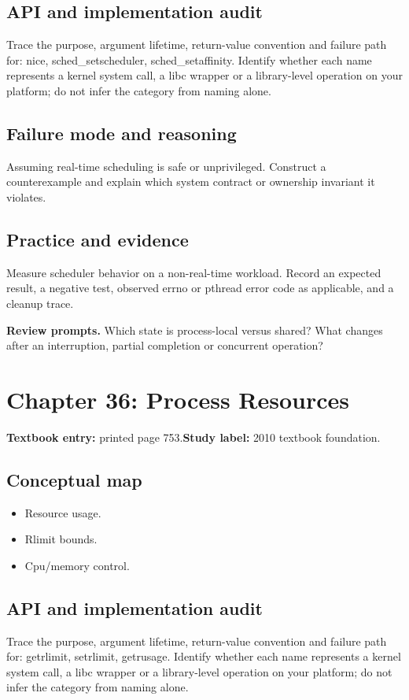 \documentclass[11pt,letterpaper,oneside]{report}
\begin{document}
\subsection{API and implementation audit}
Trace the purpose, argument lifetime, return-value convention and failure path for: nice, sched\_\allowbreak{}setscheduler, sched\_setaffinity. Identify whether each name represents a kernel system call, a libc wrapper or a library-level operation on your platform; do not infer the category from naming alone.

\subsection{Failure mode and reasoning}
Assuming real-time scheduling is safe or unprivileged. Construct a counterexample and explain which system contract or ownership invariant it violates.

\subsection{Practice and evidence}
Measure scheduler behavior on a non-real-time workload. Record an expected result, a negative test, observed errno or pthread error code as applicable, and a cleanup trace.

\textbf{Review prompts.} Which state is process-local versus shared? What changes after an interruption, partial completion or concurrent operation?

\section{Chapter 36: Process Resources}
\textbf{Textbook entry:} printed page 753.\quad \textbf{Study label:} 2010 textbook foundation.

\subsection{Conceptual map}
\begin{itemize}
\item Resource usage.
\item Rlimit bounds.
\item Cpu/memory control.
\end{itemize}
\subsection{API and implementation audit}
Trace the purpose, argument lifetime, return-value convention and failure path for: getrlimit, setrlimit, getrusage. Identify whether each name represents a kernel system call, a libc wrapper or a library-level operation on your platform; do not infer the category from naming alone.
\end{document}

